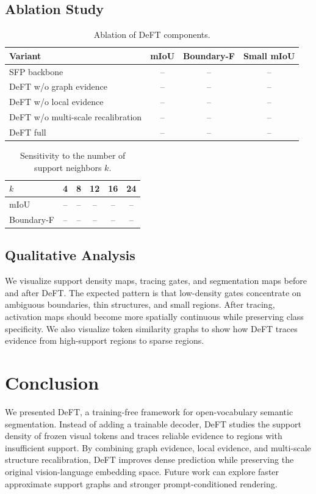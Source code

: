 \documentclass[letterpaper]{article}
\begin{document}
\subsection{Ablation Study}

\begin{table}[t]
\centering
\caption{Ablation of DeFT components.}
\begin{tabular}{lccc}
\toprule
Variant & mIoU & Boundary-F & Small mIoU \\
\midrule
SFP backbone & -- & -- & -- \\
DeFT w/o graph evidence & -- & -- & -- \\
DeFT w/o local evidence & -- & -- & -- \\
DeFT w/o multi-scale recalibration & -- & -- & -- \\
DeFT full & -- & -- & -- \\
\bottomrule
\end{tabular}
\end{table}

\begin{table}[t]
\centering
\caption{Sensitivity to the number of support neighbors $k$.}
\begin{tabular}{lccccc}
\toprule
$k$ & 4 & 8 & 12 & 16 & 24 \\
\midrule
mIoU & -- & -- & -- & -- & -- \\
Boundary-F & -- & -- & -- & -- & -- \\
\bottomrule
\end{tabular}
\end{table}

\subsection{Qualitative Analysis}

We visualize support density maps, tracing gates, and segmentation maps before
and after DeFT. The expected pattern is that low-density gates concentrate on
ambiguous boundaries, thin structures, and small regions. After tracing,
activation maps should become more spatially continuous while preserving class
specificity. We also visualize token similarity graphs to show how DeFT traces
evidence from high-support regions to sparse regions.

\section{Conclusion}

We presented DeFT, a training-free framework for open-vocabulary semantic
segmentation. Instead of adding a trainable decoder, DeFT studies the support
density of frozen visual tokens and traces reliable evidence to regions with
insufficient support. By combining graph evidence, local evidence, and
multi-scale structure recalibration, DeFT improves dense prediction while
preserving the original vision-language embedding space. Future work can explore
faster approximate support graphs and stronger prompt-conditioned rendering.



\end{document}
